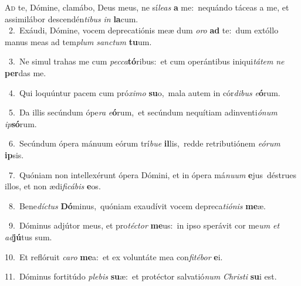 \lettrine{\initial\textcolor{\initialcolor}{A}}{d} te, Dómine, clamábo, Deus meus, ne sí\-\textit{le}\-\textit{as} \textbf{a} me:~\star nequándo táceas a me, et assimilábor descendén\-\textit{ti}\-\textit{bus} \textit{in} \textbf{la}\-cum.\\
{\numbfont\textcolor{\numbcolor}{~2.}}~Exáudi, Dómine, vocem deprecatiónis meæ dum \textit{o}\-\textit{ro} \textbf{ad} te:~\star dum extóllo manus meas ad tem\textit{plum} \textit{sanc}\-\textit{tum} \textbf{tu}\-um.\par
{\numbfont\textcolor{\numbcolor}{~3.}}~Ne simul trahas me cum \textit{pec}\-\textit{ca}\textbf{tó}ribus:~\star et cum operántibus iniqui\-\textit{tá}\-\textit{tem} \textit{ne} \textbf{per}\-das me.\par
{\numbfont\textcolor{\numbcolor}{~4.}}~Qui loquúntur pacem cum pró\-\textit{xi}\-\textit{mo} \textbf{su}\-o,~\star mala autem in cór\-\textit{di}\-\textit{bus} \textit{e}\-\textbf{ó}rum.\par
{\numbfont\textcolor{\numbcolor}{~5.}}~Da illis secúndum ópe\textit{ra} \textit{e}\-\textbf{ó}rum,~\star et secúndum nequítiam adinventi\-\textit{ó}\-\textit{num} \textit{ip}\-\textbf{só}rum.\par
{\numbfont\textcolor{\numbcolor}{~6.}}~Secúndum ópera mánuum eórum trí\-\textit{bu}\-\textit{e} \textbf{il}\-lis,~\star redde retributiónem \textit{e}\-\textit{ó}\textit{rum} \textbf{ip}\-sis.\par
{\numbfont\textcolor{\numbcolor}{~7.}}~Quóniam non intellexérunt ópera Dómini, et in ópera má\-\textit{nu}\-\textit{um} \textbf{e}\-jus~\star déstrues illos, et non ædi\-\textit{fi}\-\textit{cá}\textit{bis} \textbf{e}\-os.\par
{\numbfont\textcolor{\numbcolor}{~8.}}~Bene\-\textit{díc}\-\textit{tus} \textbf{Dó}\-minus,~\star quóniam exaudívit vocem depreca\-\textit{ti}\-\textit{ó}\textit{nis} \textbf{me}\-æ.\par
{\numbfont\textcolor{\numbcolor}{~9.}}~Dóminus adjútor meus, et pro\-\textit{téc}\-\textit{tor} \textbf{me}\-us:~\star in ipso sperávit cor me\textit{um} \textit{et} \textit{ad}\-\textbf{jú}tus sum.\par
{\numbfont\textcolor{\numbcolor}{10.}}~Et reflóruit \textit{ca}\-\textit{ro} \textbf{me}\-a:~\star et ex voluntáte mea con\-\textit{fi}\-\textit{té}\textit{bor} \textbf{e}\-i.\par
{\numbfont\textcolor{\numbcolor}{11.}}~Dóminus fortitúdo \textit{ple}\-\textit{bis} \textbf{su}\-æ:~\star et protéctor salvatió\textit{num} \textit{Chris}\-\textit{ti} \textbf{su}\-i est.\par
